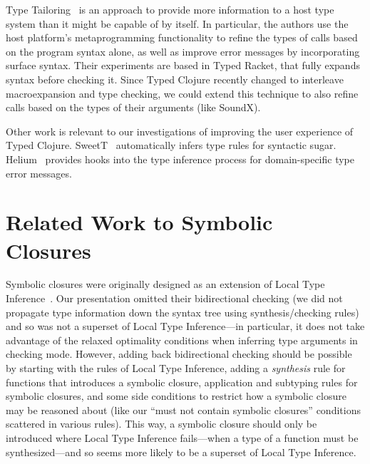 \documentclass[11pt]{iuthesis}
\begin{document}
Type Tailoring~\cite{greenmanttailoring} is an approach to provide more information
to a host type system than it might be capable of by itself.
In particular, the authors use the host platform's metaprogramming functionality
to refine the types of calls based on the program syntax alone, as well as improve
error messages by incorporating surface syntax. Their experiments are based in Typed Racket, that fully expands
syntax before checking it. Since Typed Clojure recently changed to interleave macroexpansion
and type checking, we could extend this technique to also refine calls based on the
types of their arguments (like SoundX).

Other work is relevant to our investigations of improving the user experience
of Typed Clojure. SweetT~\cite{pombrio2018inferring} automatically infers type rules
for syntactic sugar. Helium~\cite{Heeren2003STI} provides hooks into the type inference
process for domain-specific type error messages.

\chapter{Related Work to Symbolic Closures%
}

Symbolic closures were originally designed as an extension of Local Type Inference~\cite{PierceLTI}.
Our presentation omitted their bidirectional checking (we did not propagate type information down the syntax
tree using synthesis/checking rules)
and so was not a superset of Local Type Inference---in
particular, it does not take advantage of the relaxed optimality conditions when inferring type
arguments in checking mode.
However, adding back bidirectional checking should be possible by starting with the rules of Local
Type Inference, adding a \emph{synthesis} rule for functions that introduces a symbolic
closure, application and subtyping rules for symbolic closures, and some side conditions to restrict 
how a symbolic closure may be reasoned about (like our ``must not contain symbolic closures''
conditions scattered in various rules).
This way, a symbolic closure should only be introduced where Local Type Inference fails---when
a type of a function must be synthesized---and so seems more likely to be a superset of 
Local Type Inference.
\end{document}
